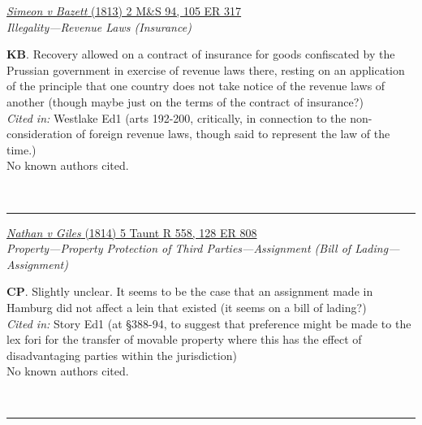 \documentclass[twoside]{article}
\begin{document}
        \begin{small}
        \begin{center}
        \href{https://heinonline.org/HOL/P?h=hein.engrep/engrf0105&i=321}{\textit{Simeon v Bazett} (1813) 2 M\&S 94, 105 ER 317} \label{78} \\ 
\textit{Illegality---Revenue Laws (Insurance)}\\
        \end{center}
        \textbf{KB}. Recovery allowed on a contract of insurance for goods confiscated by the Prussian government in exercise of revenue laws there, resting on an application of the principle that one country does not take notice of the revenue laws of another (though maybe just on the terms of the contract of insurance?)\\\textit{Cited in: }Westlake Ed1 (arts 192-200, critically, in connection to the non-consideration of foreign revenue laws, though said to represent the law of the time.)\\No known authors cited.
        \end{small}\\
        \rule{\textwidth}{0.5pt}
        

        \begin{small}
        \begin{center}
        \href{https://heinonline.org/HOL/P?h=hein.engrep/engrg0128&i=812}{\textit{Nathan v Giles} (1814) 5 Taunt R 558, 128 ER 808} \label{123} \\ 
\textit{Property---Property Protection of Third Parties---Assignment (Bill of Lading---Assignment)}\\
        \end{center}
        \textbf{CP}. Slightly unclear. It seems to be the case that an assignment made in Hamburg did not affect a lein that existed (it seems on a bill of lading?)\\\textit{Cited in: }Story Ed1 (at §388-94, to suggest that preference might be made to the lex fori for the transfer of movable property where this has the effect of disadvantaging parties within the jurisdiction)\\No known authors cited.
        \end{small}\\
        \rule{\textwidth}{0.5pt}
        
\end{document}
